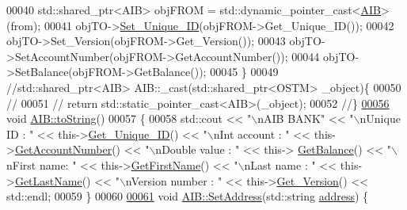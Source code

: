 \begin{DoxyCode}
00040     std::shared\_ptr<AIB> objFROM = std::dynamic\_pointer\_cast<\hyperlink{class_a_i_b}{AIB}>(from);
00041     objTO->\hyperlink{class_o_s_t_m_ab5019a32185631c08abbf826422f2d93_ab5019a32185631c08abbf826422f2d93}{Set\_Unique\_ID}(objFROM->Get\_Unique\_ID());
00042     objTO->Set\_Version(objFROM->Get\_Version());
00043     objTO->SetAccountNumber(objFROM->GetAccountNumber());
00044     objTO->SetBalance(objFROM->GetBalance());
00045 \}
00049 \textcolor{comment}{//std::shared\_ptr<AIB> AIB::\_cast(std::shared\_ptr<OSTM> \_object)\{}
00050 \textcolor{comment}{//    }
00051 \textcolor{comment}{//    return std::static\_pointer\_cast<AIB>(\_object);}
00052 \textcolor{comment}{//\}}
\hypertarget{_a_i_b_8cpp_source.tex_l00056}{}\hyperlink{class_a_i_b_aff0f0a0db75a17efec4bd500b888232d_aff0f0a0db75a17efec4bd500b888232d}{00056} \textcolor{comment}{}\textcolor{keywordtype}{void} \hyperlink{class_a_i_b_aff0f0a0db75a17efec4bd500b888232d_aff0f0a0db75a17efec4bd500b888232d}{AIB::toString}()
00057 \{
00058     std::cout << \textcolor{stringliteral}{"\(\backslash\)nAIB BANK"} << \textcolor{stringliteral}{"\(\backslash\)nUnique ID : "} << this->\hyperlink{class_o_s_t_m_a5a01a8b98d16b1d1904ecf9356e7b71d_a5a01a8b98d16b1d1904ecf9356e7b71d}{Get\_Unique\_ID}() << \textcolor{stringliteral}{"\(\backslash\)nInt account :
       "} << this->\hyperlink{class_a_i_b_aef34bfbf20d767114e05b8b532cab777_aef34bfbf20d767114e05b8b532cab777}{GetAccountNumber}() << \textcolor{stringliteral}{"\(\backslash\)nDouble value : "} << this->
      \hyperlink{class_a_i_b_ac75087ae73c308bd946e47a71dc85b86_ac75087ae73c308bd946e47a71dc85b86}{GetBalance}() << \textcolor{stringliteral}{"\(\backslash\)nFirst name: "} << this->\hyperlink{class_a_i_b_aa0833919c1c211481560cd88cb5b381b_aa0833919c1c211481560cd88cb5b381b}{GetFirstName}() << \textcolor{stringliteral}{"\(\backslash\)nLast name : "} << 
      this->\hyperlink{class_a_i_b_a1b09db7268734beeaf6a9e7e9d8feb02_a1b09db7268734beeaf6a9e7e9d8feb02}{GetLastName}()  << \textcolor{stringliteral}{"\(\backslash\)nVersion number : "} << this->\hyperlink{class_o_s_t_m_a1f1db9d482f22c8e7caa17dfb340626b_a1f1db9d482f22c8e7caa17dfb340626b}{Get\_Version}() << std::endl;
00059 \}
00060 
\hypertarget{_a_i_b_8cpp_source.tex_l00061}{}\hyperlink{class_a_i_b_ab5fd22fbbc0ea75a022aaeb7174fc450_ab5fd22fbbc0ea75a022aaeb7174fc450}{00061} \textcolor{keywordtype}{void} \hyperlink{class_a_i_b_ab5fd22fbbc0ea75a022aaeb7174fc450_ab5fd22fbbc0ea75a022aaeb7174fc450}{AIB::SetAddress}(std::string \hyperlink{class_a_i_b_ae6a67cc33d1e5fa83a52a238e45ca3dc_ae6a67cc33d1e5fa83a52a238e45ca3dc}{address}) \{

\end{DoxyCode}
